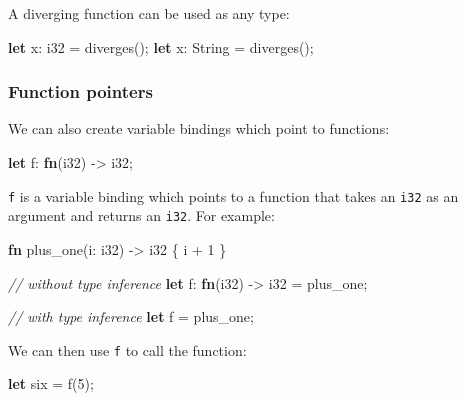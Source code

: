 \documentclass[a4paper,]{book}
\newenvironment{Shaded}{\begin{snugshade}}{\end{snugshade}}
\newcommand{\KeywordTok}[1]{\textcolor[rgb]{0.13,0.29,0.53}{\textbf{{#1}}}}
\newcommand{\DataTypeTok}[1]{\textcolor[rgb]{0.13,0.29,0.53}{{#1}}}
\newcommand{\DecValTok}[1]{\textcolor[rgb]{0.00,0.00,0.81}{{#1}}}
\newcommand{\CommentTok}[1]{\textcolor[rgb]{0.56,0.35,0.01}{\textit{{#1}}}}
\newcommand{\NormalTok}[1]{{#1}}
\begin{document}
A diverging function can be used as any type:

\begin{Shaded}
\begin{Highlighting}[]
\KeywordTok{let} \NormalTok{x: }\DataTypeTok{i32} \NormalTok{= diverges();}
\KeywordTok{let} \NormalTok{x: }\DataTypeTok{String} \NormalTok{= diverges();}
\end{Highlighting}
\end{Shaded}

\subsubsection{Function pointers}\label{function-pointers}

We can also create variable bindings which point to functions:

\begin{Shaded}
\begin{Highlighting}[]
\KeywordTok{let} \NormalTok{f: }\KeywordTok{fn}\NormalTok{(}\DataTypeTok{i32}\NormalTok{) -> }\DataTypeTok{i32}\NormalTok{;}
\end{Highlighting}
\end{Shaded}

\texttt{f} is a variable binding which points to a function that takes
an \texttt{i32} as an argument and returns an \texttt{i32}. For example:

\begin{Shaded}
\begin{Highlighting}[]
\KeywordTok{fn} \NormalTok{plus_one(i: }\DataTypeTok{i32}\NormalTok{) -> }\DataTypeTok{i32} \NormalTok{\{}
    \NormalTok{i + }\DecValTok{1}
\NormalTok{\}}

\CommentTok{// without type inference}
\KeywordTok{let} \NormalTok{f: }\KeywordTok{fn}\NormalTok{(}\DataTypeTok{i32}\NormalTok{) -> }\DataTypeTok{i32} \NormalTok{= plus_one;}

\CommentTok{// with type inference}
\KeywordTok{let} \NormalTok{f = plus_one;}
\end{Highlighting}
\end{Shaded}

We can then use \texttt{f} to call the function:

\begin{Shaded}
\begin{Highlighting}[]
\KeywordTok{let} \NormalTok{six = f(}\DecValTok{5}\NormalTok{);}
\end{Highlighting}
\end{Shaded}
\end{document}
